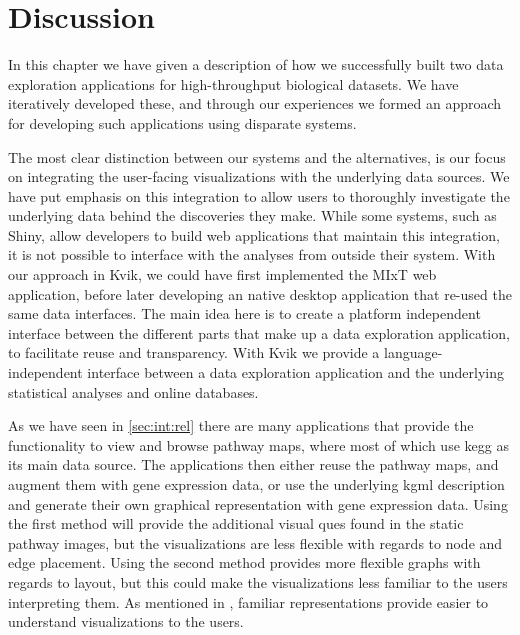 \section{Discussion}
In this chapter we have given a description of how we successfully built two
data exploration applications for high-throughput biological datasets. We have
iteratively developed these, and through our experiences we formed
an approach for developing such applications using disparate systems. 

The most clear distinction between our systems and the alternatives, is our
focus on integrating the user-facing visualizations with the underlying data
sources. We have put emphasis on this integration to allow users to thoroughly
investigate the underlying data behind the discoveries they make.  While some
systems, such as Shiny, allow developers to build web applications that maintain
this integration, it is not possible to interface with the analyses from outside
their system. With our approach in Kvik, we could have first implemented the
MIxT web application, before later developing an native desktop application that
re-used the same data interfaces. The main idea here is to create a platform
independent interface between the different parts that make up a data
exploration application, to facilitate reuse and transparency. With Kvik we
provide a language-independent interface between a data exploration application
and the underlying statistical analyses and online
databases. 

As we have seen in \ref{sec:int:rel} there are many applications that provide
the functionality to view and browse pathway maps, where most of which
use \gls{kegg} as its main data source. The applications then either reuse
the pathway maps, and augment them with gene expression data, or use the
underlying \gls{kgml} description and generate their own graphical
representation with gene expression data. Using the first method will provide
the additional visual ques found in the static pathway images, but the
visualizations are less flexible with regards to node and edge placement. Using
the second method provides more flexible graphs with regards to layout, but this
could make the visualizations less familiar to the users interpreting them. As
mentioned in \cite{o2018visualization}, familiar representations provide easier
to understand visualizations to the users. 

